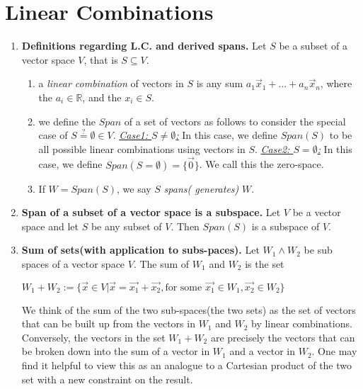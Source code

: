 \documentclass[oneside, 12pt]{book}
\newcommand{\settag}[1]{\renewcommand{\theenumi}{#1}}
\newcommand{\R}{\mathbb{R}}
\newcommand{\tit}[1]{\textit{#1}}
\begin{document}
\section{Linear Combinations}
    \begin{enumerate}
        \settag{1.3.1}
        \item \textbf{Definitions regarding L.C. and derived spans.} Let $S$ be a subset of a vector space $V$, that is $S\subseteq V$.
        \begin{enumerate}
            \item a \textit{linear combination} of vectors in $S$ is any sum $a_1\vec{x}_1 + ... + a_n\vec{x}_n$, where the $a_i \in \R$, and the $x_i \in S$.
            \item we define the $Span$ of a set of vectors as follows to consider the special case of $S\stackrel{?}{=}\emptyset \in V$.
            \newline \underline{\tit{Case1: $S\neq \emptyset$:}} In this case, we define $Span(S)$ to be all possible linear combinations using vectors in $S$.\newline
            \underline{\tit{Case2: $S= \emptyset$:}} In this case, we define $Span(S = \emptyset)=\{\vec{0}\}$. We call this the zero-space.
            
            \item If $W=Span(S)$, we say $S$ \textit{spans( generates)} $W$.
        \end{enumerate}
        
        \settag{1.3.4}
        \item \textbf{Span of a  subset of a vector space is a subspace.} Let $V$ be a vector space and let $S$ be any subset of $V$. Then $Span(S)$ is a subspace of $V$.
        
        \settag{1.3.5}
        \item \textbf{Sum of sets(with application to subs-paces).} Let $W_1\wedge W_2$ be sub spaces of a vector space $V$. The sum of $W_1$ and $W_2$ is the set
        \begin{center}
            $W_1+W_2 :=\{\vec{x}\in V |\vec{x}=\vec{x_1}+\vec{x_2}, \text{for some } \vec{x_1}\in W_1, \vec{x_2} \in W_2\}$
        \end{center}
        We think of the sum of the two sub-spaces(the two sets) as the set of vectors that can be built up from the vectors in $W_1$ and $W_2$ by linear combinations. Conversely, the vectors in the set $W_1+W_2$ are precisely the vectors that can be broken down into the sum of a vector in $W_1$ and a vector in $W_2$. One may find it helpful to view this as an analogue to a Cartesian product of the two set with a new constraint on the result.
        

\end{enumerate}
\end{document}
